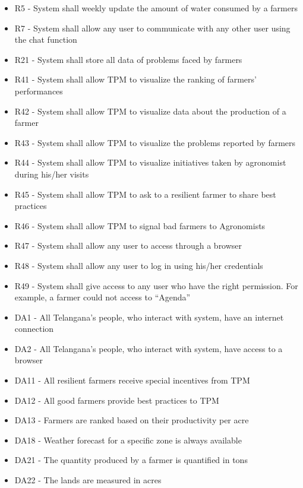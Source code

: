 \begin{enumerate}[label=\textbf{G.\arabic*}]
\begin{enumerate} [label=\textbf{G.4.\arabic*}]
\begin{itemize} [label =]
            \item R5 - System shall weekly update the amount of water consumed by a farmers 
            \item R7 - System shall allow any user to communicate with any other user using the chat function
            \item R21 - System shall store all data of problems faced by farmers
            \item R41 - System shall allow TPM to visualize the ranking of farmers’ performances
            \item R42 - System shall allow TPM to visualize data about the production of a farmer
            \item R43 - System shall allow TPM to visualize the problems reported by farmers
            \item R44 - System shall allow TPM to visualize initiatives taken by agronomist during his/her visits
            \item R45 - System shall allow TPM to ask to a resilient farmer to share best practices
            \item R46 - System shall allow TPM to signal bad farmers to Agronomists
            \item R47 - System shall allow any user to access through a browser
            \item R48 - System shall allow any user to log in using his/her credentials
            \item R49 - System shall give access to any user who have the right permission. For example, a farmer could not access to “Agenda”
            \item DA1 - All Telangana’s people, who interact with system, have an internet connection
            \item DA2 - All Telangana’s people, who interact with system, have access to a browser
            \item DA11 - All resilient farmers receive special incentives from TPM
            \item DA12 - All good farmers provide best practices to TPM
            \item DA13 - Farmers are ranked based on their productivity per acre
            \item DA18 - Weather forecast for a specific zone is always available
            \item DA21 - The quantity produced by a farmer is quantified in tons
            \item DA22 - The lands are measured in acres

\end{itemize}
\end{enumerate}
\end{enumerate}
